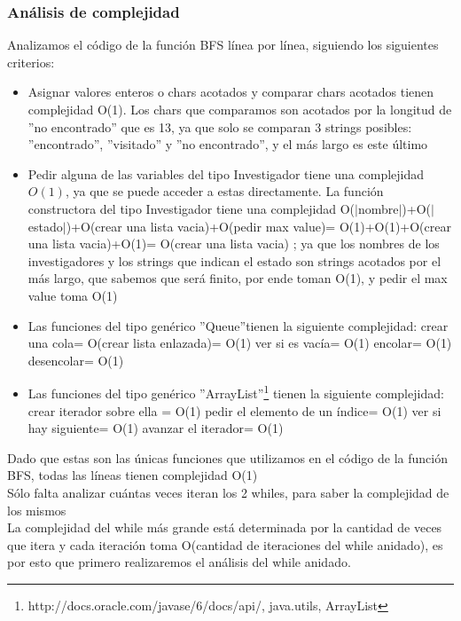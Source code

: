 \subsubsection{Análisis de complejidad}
\indent Analizamos el código de la función BFS línea por línea, siguiendo los
siguientes criterios:
\begin{itemize}
 \item Asignar valores enteros o chars acotados y comparar chars acotados
 tienen complejidad O(1). Los chars que comparamos son acotados por la
 longitud de ''no encontrado'' que es 13, ya que solo se
 comparan 3 strings posibles: ''encontrado'', ''visitado'' y ''no encontrado'', y
 el más largo es este último
 \item Pedir alguna de las variables del tipo Investigador tiene una complejidad
$O(1)$, 
 ya que se puede acceder a estas directamente.
 \subitem La función constructora del tipo Investigador tiene una complejidad 
 O($|$nombre$|$)+O($|$estado$|$)+O(crear una lista vacia)+O(pedir max value)=
 O(1)+O(1)+O(crear una lista vacia)+O(1)= O(crear una lista vacia) ;
 ya que los nombres de los investigadores y los strings que indican el estado
 son strings acotados por el más largo, que sabemos que será finito, por ende
toman O(1), y
 pedir el max value toma O(1)
 \item Las funciones del tipo genérico ''Queue''tienen la siguiente complejidad:
 \subitem crear una cola= O(crear lista enlazada)= O(1)
 \subitem ver si es vacía= O(1)
 \subitem encolar= O(1)
 \subitem desencolar= O(1)
 \item Las funciones del tipo genérico
''ArrayList''\footnote{http://docs.oracle.com/javase/6/docs/api/, java.utils,
ArrayList}  tienen
 la siguiente complejidad:
 \subitem crear iterador sobre ella = O(1)
 \subitem pedir el elemento de un índice= O(1)
 \subitem ver si hay siguiente= O(1)
 \subitem avanzar el iterador= O(1)
 
\end{itemize}

\indent Dado que estas son las únicas funciones que utilizamos en el código de
la función BFS, todas las líneas tienen complejidad O(1)\\
\indent Sólo falta analizar cuántas veces iteran los 2 whiles, para saber la 
complejidad de los mismos\\

\indent La complejidad del while más grande está determinada por la cantidad de
veces que itera 
y cada iteración toma O(cantidad de iteraciones del while anidado), es por esto
que
primero realizaremos el análisis del while anidado.\\

